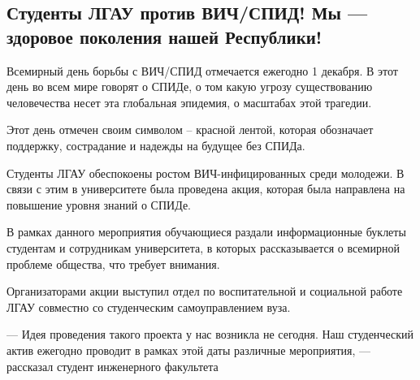  
 
 
 
 
\subsection{Студенты ЛГАУ против ВИЧ/СПИД! Мы — здоровое поколения нашей Республики!}
\label{sec:01_12_2021.stz.edu.lnr.lgau.1.studenty_protiv_spid}





Всемирный день борьбы с ВИЧ/СПИД отмечается ежегодно 1 декабря. В этот день во
всем мире говорят о СПИДе, о том какую угрозу существованию человечества несет
эта глобальная эпидемия, о масштабах этой трагедии.

Этот день отмечен своим символом – красной лентой, которая обозначает
поддержку, сострадание и надежды на будущее без СПИДа.

Студенты ЛГАУ обеспокоены ростом ВИЧ-инфицированных среди молодежи. В связи с
этим в университете была проведена акция, которая была направлена на повышение
уровня знаний о СПИДе.

В рамках данного мероприятия обучающиеся раздали информационные буклеты
студентам и сотрудникам университета, в которых рассказывается о всемирной
проблеме общества, что требует внимания.

Организаторами акции выступил отдел по воспитательной и социальной работе ЛГАУ
совместно со студенческим самоуправлением вуза.

\begin{zzquote}
— Идея проведения такого проекта у нас возникла не сегодня. Наш студенческий
актив  ежегодно проводит в рамках этой даты различные мероприятия, —  рассказал
студент инженерного факультета 
\end{zzquote}

